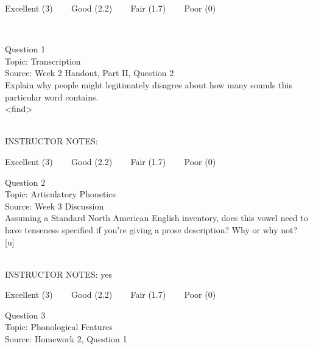 \documentclass[12pt]{article}
\begin{document}
\vfill
Excellent (3) ~~~ Good (2.2) ~~~ Fair (1.7) ~~~ Poor (0)
\newpage

\begin{center}
\textbf{{\color{red}{\HUGE END OF EXAM}}}\\

\end{center}
\newpage

\begin{center}
\textbf{{\color{blue}{\HUGE START OF EXAM\\}}}

\textbf{{\color{blue}{\HUGE Student ID: 53176\\}}}

\textbf{{\color{blue}{\HUGE \\}}}

\end{center}
\newpage

{\large Question 1}\\

Topic: Transcription\\
Source: Week 2 Handout, Part II, Question 2\\

Explain why people might legitimately disagree about how many sounds this particular word contains.\\

<find>


~\\
INSTRUCTOR NOTES: 


\vfill
Excellent (3) ~~~ Good (2.2) ~~~ Fair (1.7) ~~~ Poor (0)
\newpage

{\large Question 2}\\

Topic: Articulatory Phonetics\\
Source: Week 3 Discussion\\

Assuming a Standard North American English inventory, does this vowel need to have tenseness specified if you're giving a prose description? Why or why not?\\

{[u]}


~\\
INSTRUCTOR NOTES: yes


\vfill
Excellent (3) ~~~ Good (2.2) ~~~ Fair (1.7) ~~~ Poor (0)
\newpage

{\large Question 3}\\

Topic: Phonological Features\\
Source: Homework 2, Question 1\\
\end{document}
